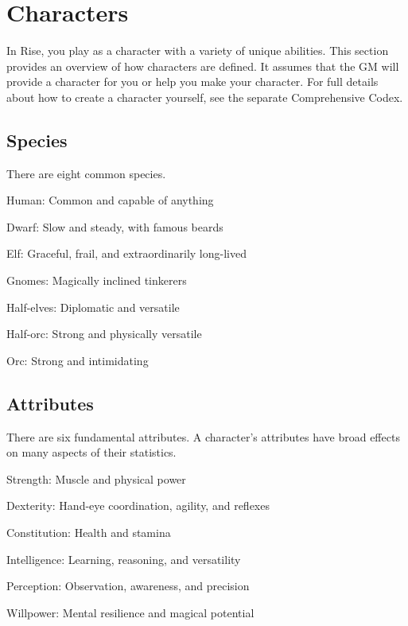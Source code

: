 \chapter{Characters}\label{Characters}

In Rise, you play as a character with a variety of unique abilities.
This section provides an overview of how characters are defined.
It assumes that the GM will provide a character for you or help you make your character.
For full details about how to create a character yourself, see the separate Comprehensive Codex.

\section{Species}
  There are eight common species.
  \begin{raggeditemize}
    \item Human: Common and capable of anything
    \item Dwarf: Slow and steady, with famous beards
    \item Elf: Graceful, frail, and extraordinarily long-lived
    \item Gnomes: Magically inclined tinkerers
    \item Half-elves: Diplomatic and versatile
    \item Half-orc: Strong and physically versatile
    \item Orc: Strong and intimidating
  \end{raggeditemize}

\section{Attributes}
  There are six fundamental attributes.
  A character's attributes have broad effects on many aspects of their statistics.
  \begin{raggeditemize}
    \item Strength: Muscle and physical power
    \item Dexterity: Hand-eye coordination, agility, and reflexes
    \item Constitution: Health and stamina
    \item Intelligence: Learning, reasoning, and versatility
    \item Perception: Observation, awareness, and precision
    \item Willpower: Mental resilience and magical potential
  \end{raggeditemize}

